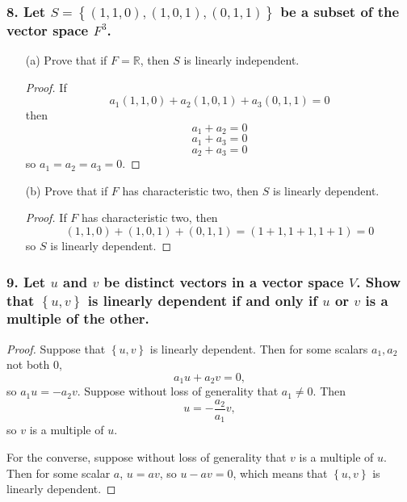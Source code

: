 \documentclass{article}
\newcommand{\R}{\mathbb{R}}
\begin{document}
\subsubsection*{8. Let $S = \left\{(1, 1, 0), (1, 0, 1), (0, 1, 1)\right\}$ be a subset of the vector space $F^3$.}
\begin{enumerate}
	\item[(a)] Prove that if $F = \R$, then $S$ is linearly independent.
	\begin{proof}
		If \[a_1(1, 1, 0) + a_2(1, 0, 1) + a_3(0, 1, 1) = 0\] then \[a_1 + a_2 = 0\]\[a_1 + a_3 = 0\]\[a_2 + a_3 = 0\] so $a_1 = a_2 = a_3 = 0$.
	\end{proof}
	\item[(b)] Prove that if $F$ has characteristic two, then $S$ is linearly dependent.
	\begin{proof}
		If $F$ has characteristic two, then \[(1, 1, 0) + (1, 0, 1) + (0, 1, 1) = (1 + 1, 1 + 1, 1+ 1) = 0\]so $S$ is linearly dependent.
	\end{proof}
\end{enumerate}

\subsubsection*{9. Let $u$ and $v$ be distinct vectors in a vector space $V$. Show that $\left\{u, v\right\}$ is linearly dependent if and only if $u$ or $v$ is a multiple of the other.}
\begin{proof}
	Suppose that $\left\{u, v\right\}$ is linearly dependent. Then for some scalars $a_1, a_2$ not both $0$, \[a_1u + a_2v = 0,\] so $a_1u = -a_2v$. Suppose without loss of generality that $a_1 \ne 0$. Then \[u = -\frac{a_2}{a_1}v,\] so $v$ is a multiple of $u$.
	
	For the converse, suppose without loss of generality that $v$ is a multiple of $u$. Then for some scalar $a$, $u = av$, so $u - av = 0$, which means that $\left\{u, v\right\}$ is linearly dependent.
\end{proof}
\end{document}
